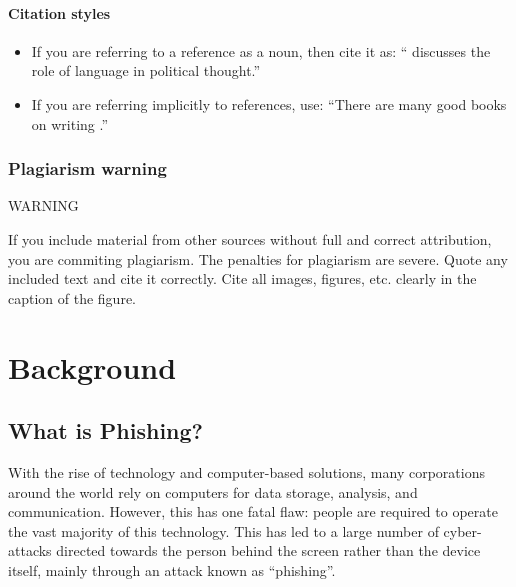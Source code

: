 \documentclass{l4proj}
\begin{document}
\subsubsection{Citation styles}

\begin{itemize}
\item If you are referring to a reference as a noun, then cite it as: ``\citet{Orw68} discusses the role of language in political thought.''
\item If you are referring implicitly to references, use: ``There are many good books on writing \citep{Orw68, Wil09, Pin15}.''
\end{itemize}
\subsection{Plagiarism warning}

\begin{highlight_title}{WARNING}
    
    If you include material from other sources without full and correct attribution, you are commiting plagiarism. The penalties for plagiarism are severe.
    Quote any included text and cite it correctly. Cite all images, figures, etc. clearly in the caption of the figure.
\end{highlight_title}


\chapter{Background}

\section{What is Phishing?}
With the rise of technology and computer-based solutions, many corporations around the world rely on computers for data storage, analysis, and communication. However, this has one fatal flaw: people are required to operate the vast majority of this technology. This has led to a large number of cyber-attacks directed towards the person behind the screen rather than the device itself, mainly through an attack known as “phishing”.
\end{document}
